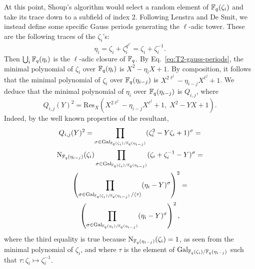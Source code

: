 \documentclass{sig-alternate}
\begin{document}
At this point, Shoup's algorithm would select a random element of
$\mathbb{F}_q(\zeta_i)$ and take its trace down to a subfield of index
$2$. Following Lenstra and De Smit, we instead define some specific
Gauss periods generating the $\ell$-adic tower. These are the
following traces of the $\zeta_i$'s:
\begin{equation}
  \label{eq:T2-gauss-periods}
  \eta_i = \zeta_i + \zeta_i^{q^{\ell^i}} = \zeta_i + \zeta_i^{-1}.
\end{equation}
Then $\bigcup_i\mathbb{F}_q(\eta_i)$ is the $\ell$-adic closure of $\mathbb{F}_q$. By
Eq.~\eqref{eq:T2-gauss-periods}, the minimal polynomial of $\zeta_i$
over $\mathbb{F}_q(\eta_i)$ is $X^2 -\eta_iX+1$. By composition, it follows
that the minimal polynomial of $\zeta_i$ over $\mathbb{F}_q(\eta_{i-j})$ is
$X^{2\ell^j}-\eta_{i-j}X^{\ell^j}+1$. We deduce that the minimal
polynomial of $\eta_i$ over $\mathbb{F}_q(\eta_{i-j})$ is $Q_{i,j}$, where
\begin{equation}
  \label{eq:T2-relpols}
  Q_{i,j}(Y)^2 = \mathrm{Res}_X(X^{2\ell^j}-\eta_{i-j}X^{\ell^j}+1,\; X^2-YX+1).
\end{equation}
Indeed, by the well known properties of the resultant,
\begin{multline*}
  Q_{i,j}(Y)^2 = \prod_{\sigma\in\operatorname{Gal}_{\mathbb{F}_q(\zeta_i)/\mathbb{F}_q(\eta_{i-j})}}
  (\zeta_i^2 - Y\zeta_i + 1)^\sigma =\\
  \operatorname{N}_{\mathbb{F}_q(\eta_{i-j})}(\zeta_i) \prod_{\sigma\in\operatorname{Gal}_{\mathbb{F}_q(\zeta_i)/\mathbb{F}_q(\eta_{i-j})}} 
  (\zeta_i + \zeta_i^{-1} - Y)^\sigma =\\
  \left(\prod_{\sigma\in\operatorname{Gal}_{\mathbb{F}_q(\zeta_i)/\mathbb{F}_q(\eta_{i-j})}/\langle\tau\rangle}
    (\eta_i - Y)^\sigma\right)^2 =\\
  \left(\prod_{\sigma\in\operatorname{Gal}_{\mathbb{F}_q(\eta_i)/\mathbb{F}_q(\eta_{i-j})}}
    (\eta_i - Y)^\sigma\right)^2,
\end{multline*}
where the third equality is true because
$\operatorname{N}_{\mathbb{F}_q(\eta_{i-j})}(\zeta_i)=1$, as seen from the minimal
polynomial of $\zeta_i$, and where $\tau$ is the element of
$\operatorname{Gal}_{\mathbb{F}_q(\zeta_i)/\mathbb{F}_q(\eta_{i-j})}$ such that
$\tau:\zeta_i\mapsto\zeta_i^{-1}$.
\end{document}

